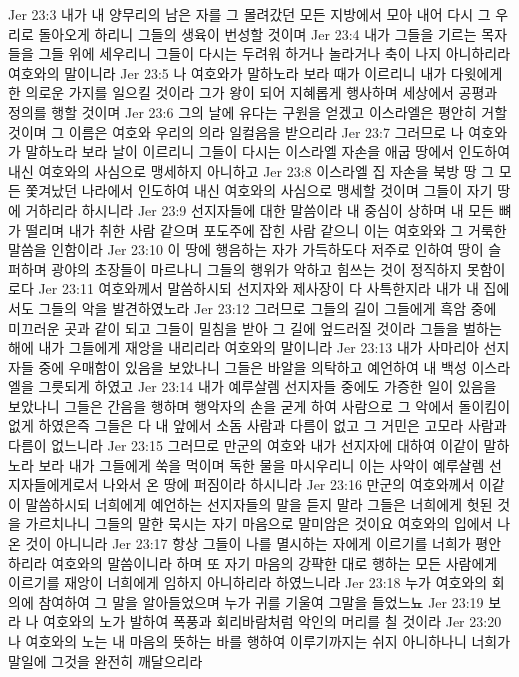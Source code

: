 Jer 23:3  내가 내 양무리의 남은 자를 그 몰려갔던 모든 지방에서 모아 내어 다시 그 우리로 돌아오게 하리니 그들의 생육이 번성할 것이며
Jer 23:4  내가 그들을 기르는 목자들을 그들 위에 세우리니 그들이 다시는 두려워 하거나 놀라거나 축이 나지 아니하리라 여호와의 말이니라
Jer 23:5  나 여호와가 말하노라 보라 때가 이르리니 내가 다윗에게 한 의로운 가지를 일으킬 것이라 그가 왕이 되어 지혜롭게 행사하며 세상에서 공평과 정의를 행할 것이며
Jer 23:6  그의 날에 유다는 구원을 얻겠고 이스라엘은 평안히 거할 것이며 그 이름은 여호와 우리의 의라 일컬음을 받으리라
Jer 23:7  그러므로 나 여호와가 말하노라 보라 날이 이르리니 그들이 다시는 이스라엘 자손을 애굽 땅에서 인도하여 내신 여호와의 사심으로 맹세하지 아니하고
Jer 23:8  이스라엘 집 자손을 북방 땅 그 모든 쫓겨났던 나라에서 인도하여 내신 여호와의 사심으로 맹세할 것이며 그들이 자기 땅에 거하리라 하시니라
Jer 23:9  선지자들에 대한 말씀이라 내 중심이 상하며 내 모든 뼈가 떨리며 내가 취한 사람 같으며 포도주에 잡힌 사람 같으니 이는 여호와와 그 거룩한 말씀을 인함이라
Jer 23:10  이 땅에 행음하는 자가 가득하도다 저주로 인하여 땅이 슬퍼하며 광야의 초장들이 마르나니 그들의 행위가 악하고 힘쓰는 것이 정직하지 못함이로다
Jer 23:11  여호와께서 말씀하시되 선지자와 제사장이 다 사특한지라 내가 내 집에서도 그들의 악을 발견하였노라
Jer 23:12  그러므로 그들의 길이 그들에게 흑암 중에 미끄러운 곳과 같이 되고 그들이 밀침을 받아 그 길에 엎드러질 것이라 그들을 벌하는 해에 내가 그들에게 재앙을 내리리라 여호와의 말이니라
Jer 23:13  내가 사마리아 선지자들 중에 우매함이 있음을 보았나니 그들은 바알을 의탁하고 예언하여 내 백성 이스라엘을 그릇되게 하였고
Jer 23:14  내가 예루살렘 선지자들 중에도 가증한 일이 있음을 보았나니 그들은 간음을 행하며 행악자의 손을 굳게 하여 사람으로 그 악에서 돌이킴이 없게 하였은즉 그들은 다 내 앞에서 소돔 사람과 다름이 없고 그 거민은 고모라 사람과 다름이 없느니라
Jer 23:15  그러므로 만군의 여호와 내가 선지자에 대하여 이같이 말하노라 보라 내가 그들에게 쑥을 먹이며 독한 물을 마시우리니 이는 사악이 예루살렘 선지자들에게로서 나와서 온 땅에 퍼짐이라 하시니라
Jer 23:16  만군의 여호와께서 이같이 말씀하시되 너희에게 예언하는 선지자들의 말을 듣지 말라 그들은 너희에게 헛된 것을 가르치나니 그들의 말한 묵시는 자기 마음으로 말미암은 것이요 여호와의 입에서 나온 것이 아니니라
Jer 23:17  항상 그들이 나를 멸시하는 자에게 이르기를 너희가 평안하리라 여호와의 말씀이니라 하며 또 자기 마음의 강퍅한 대로 행하는 모든 사람에게 이르기를 재앙이 너희에게 임하지 아니하리라 하였느니라
Jer 23:18  누가 여호와의 회의에 참여하여 그 말을 알아들었으며 누가 귀를 기울여 그말을 들었느뇨
Jer 23:19  보라 나 여호와의 노가 발하여 폭풍과 회리바람처럼 악인의 머리를 칠 것이라
Jer 23:20  나 여호와의 노는 내 마음의 뜻하는 바를 행하여 이루기까지는 쉬지 아니하나니 너희가 말일에 그것을 완전히 깨달으리라

